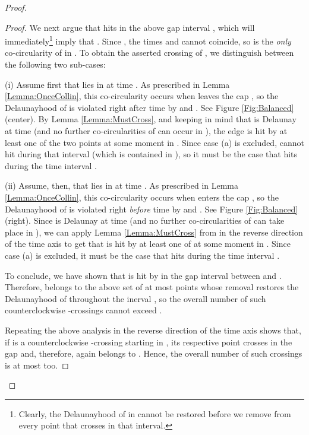 \documentclass[letter,11pt]{article}
\begin{document}
\begin{proof}
\begin{proof}
We next argue that  hits  in the above gap interval , which will immediately\footnote{Clearly, the Delaunayhood of  in  cannot be restored before we remove from  every point that crosses  in that interval.} imply that .
Since , the times  and  cannot coincide, so  is the {\it only} co-circularity of  in . To obtain the asserted crossing of , we distinguish between the following two sub-cases:

\medskip
\noindent (i) Assume first that  lies in  at time . As prescribed in Lemma \ref{Lemma:OnceCollin}, this co-circularity occurs when  leaves the cap , so the Delaunayhood of  is violated right after time  by  and . See Figure \ref{Fig:Balanced} (center).
By Lemma \ref{Lemma:MustCross}, and keeping in mind that  is Delaunay at time  (and no further co-circularities of  can occur in ), the edge  is hit by at least one of the two points  at some moment in . 
Since case (a) is excluded,  cannot hit  during that interval (which is contained in ), so it must be the case that  hits  during the time interval . 

\smallskip
\noindent (ii) Assume, then, that  lies in  at time . As prescribed in Lemma \ref{Lemma:OnceCollin}, this co-circularity occurs when  enters the cap , so the Delaunayhood of  is violated right {\it before} time  by  and . See Figure \ref{Fig:Balanced} (right).
Since  is Delaunay at time  (and no further co-circularities of  can take place in ), we can apply Lemma \ref{Lemma:MustCross} from  in the reverse direction of the time axis to get that  is hit by at least one of  at some moment in . Since case (a) is excluded, it must be the case that  hits  during the time interval .

\smallskip
To conclude, we have shown that  is hit by  in the gap interval  between  and .
Therefore,  belongs to the above set  of at most  points whose removal restores the Delaunayhood of  throughout the inerval , so the overall number of such counterclockwise -crossings  cannot exceed .

Repeating the above analysis in the reverse direction of the time axis shows that, if  is a counterclockwise -crossing starting in , its respective point  crosses  in the gap  and, therefore, again belongs to .
Hence, the overall number of such crossings  is at most  too.
\end{proof}














\end{proof}
\end{document}
